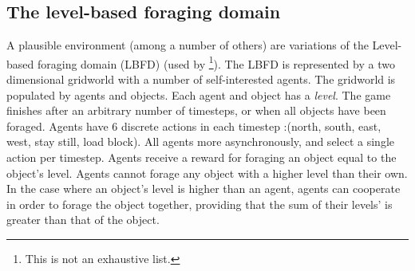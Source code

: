 \subsection{The level-based foraging domain}
A plausible environment (among a number of others) are variations of the Level-based foraging domain (LBFD) (used by \cite{Barrett2015,Papoudakis2020,Albrecht2019,Hayashi_et_al2020}\footnote{This is not an exhaustive list.}). The LBFD is represented by a two dimensional gridworld with a number of self-interested agents. The gridworld is populated by agents and objects. Each agent and object has a \textit{level}. The game finishes after an arbitrary number of timesteps, or when all objects have been foraged. Agents have 6 discrete actions in each timestep :(north, south, east, west, stay still, load block). All agents more asynchronously, and select a single action per timestep. Agents receive a reward for foraging an object equal to the object's level. Agents cannot forage any object with a higher level than their own. In the case where an object's level is higher than an agent, agents can cooperate in order to forage the object together, providing that the sum of their levels' is greater than that of the object.  
 